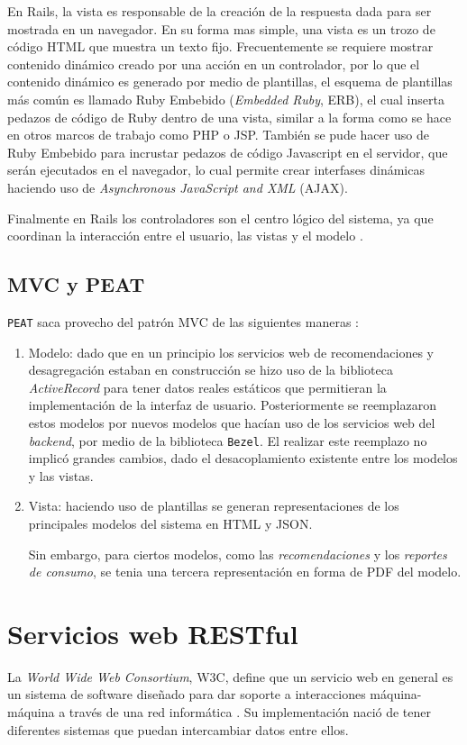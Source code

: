 En Rails, la vista es responsable de la creación de la respuesta dada para
ser mostrada en un navegador. En su forma mas simple, una
vista es un trozo de código HTML que muestra un texto fijo. Frecuentemente
se requiere mostrar contenido dinámico creado por una acción en un controlador,
por lo que el contenido dinámico es generado por medio de plantillas, el esquema
de plantillas más común es llamado Ruby Embebido (\textit{Embedded Ruby}, ERB),
el cual inserta pedazos de código de Ruby dentro de una vista, similar a la forma
como se hace en otros marcos de trabajo como PHP o JSP. También se pude hacer uso de
Ruby Embebido para incrustar pedazos de código Javascript en el servidor,
que serán ejecutados en el navegador, lo cual permite crear interfases
dinámicas haciendo uso de \textit{Asynchronous JavaScript and XML} (AJAX).

Finalmente en Rails los controladores son el centro lógico del sistema, ya que
coordinan la interacción entre el usuario, las vistas y el modelo
\cite{15_agile_hansson}.

\subsection{MVC y PEAT}
\texttt{PEAT} saca provecho del patrón MVC de las siguientes maneras \cite{15_agile_hansson}:

\begin{enumerate}
\item Modelo: dado que en un principio los servicios web de recomendaciones y
  desagregación estaban en construcción se hizo uso de la biblioteca
  \textit{ActiveRecord} para tener datos reales estáticos que permitieran
  la implementación de la interfaz de usuario.
  Posteriormente se reemplazaron estos modelos por nuevos modelos que hacían
  uso de los servicios web del \textit{backend}, por medio de la biblioteca
  \texttt{Bezel}.
  El realizar este reemplazo no implicó grandes cambios, dado el desacoplamiento
  existente entre los modelos y las vistas.
\item Vista: haciendo uso de plantillas se generan representaciones de los
  principales modelos del sistema en HTML y JSON.

  Sin embargo, para ciertos modelos, como las \textit{recomendaciones} y los
  \textit{reportes de consumo}, se tenia una tercera representación en forma
  de PDF del modelo.
\end{enumerate}

\section{Servicios web RESTful}
La \textit{World Wide Web Consortium}, W3C, define que un servicio web
en general es un sistema de software diseñado para dar soporte a interacciones
máquina-máquina a través de una red informática \cite{17_w3c_webservice}.
Su implementación nació de tener diferentes sistemas que puedan intercambiar
datos entre ellos.

